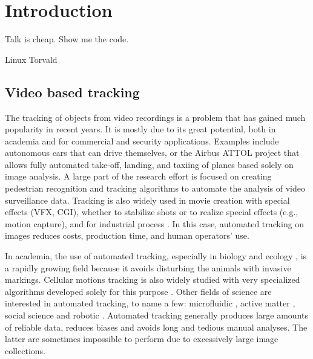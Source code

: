 \chapter{Introduction}
\label{dual}

  \epigraph{Talk is cheap. Show me the code.}{Linux Torvald}

	\section{Video based tracking}
    The tracking of objects from video recordings is a problem that has gained much popularity in recent years. It is mostly due to its great potential, both in academia and for commercial and security applications. Examples include autonomous cars that can drive themselves, or the Airbus ATTOL project \cite{ATTOL} that allows fully automated take-off, landing, and taxiing of planes based solely on image analysis. A large part of the research effort is focused on creating pedestrian recognition and tracking algorithms to automate the analysis of video surveillance data. Tracking is also widely used in movie creation with special effects (VFX, CGI), whether to stabilize shots or to realize special effects (e.g., motion capture), and for industrial process \cite{luo1988adaptive}. In this case, automated tracking on images reduces costs, production time, and human operators' use.

    In academia, the use of automated tracking, especially in biology and ecology \cite{dell2014automated,risse2017fimtrack}, is a rapidly growing field because it avoids disturbing the animals with invasive markings. Cellular motions tracking is also widely studied with very specialized algorithms developed solely for this purpose \cite{juang2009tracking,dewan2011tracking}. Other fields of science are interested in automated tracking, to name a few: microfluidic \cite{jeong2018accurately}, active matter \cite{bricard2013emergence}, social science \cite{ali2012multiple} and robotic \cite{treptow2004real}. Automated tracking generally produces large amounts of reliable data, reduces biases and avoids long and tedious manual analyses. The latter are sometimes impossible to perform due to excessively large image collections.

